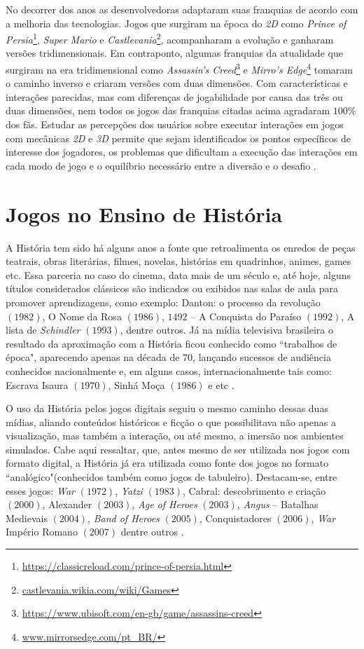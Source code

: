No decorrer dos anos as desenvolvedoras adaptaram suas franquias de acordo com a melhoria das tecnologias. Jogos que surgiram na época do \textit{2D} como \textit{Prince of Persia}\footnote{\url{https://classicreload.com/prince-of-persia.html}}, \textit{Super Mario} e \textit{Castlevania}\footnote{\url{castlevania.wikia.com/wiki/Games}}, acompanharam a evolução e ganharam versões tridimensionais. Em contraponto, algumas franquias da atualidade que surgiram na era tridimensional como \textit{Assassin’s Creed}\footnote{\url{https://www.ubisoft.com/en-gb/game/assassins-creed}} e \textit{Mirro's Edge}\footnote{\url{www.mirrorsedge.com/pt\_BR/}} tomaram o caminho inverso e criaram versões com duas dimensões. Com características e interações parecidas, mas com diferenças de jogabilidade por causa das três ou duas dimensões, nem todos os jogos das franquias citadas acima agradaram $100\%$ dos fãs. Estudar as percepções dos usuários sobre executar interações em jogos com mecânicas \textit{2D} e \textit{3D} permite que sejam identificados os pontos específicos de interesse dos jogadores, os problemas que dificultam a execução das interações em cada modo de jogo e o equilíbrio necessário entre a diversão e o desafio \cite{bib:lopes2016}.

\section{Jogos no Ensino de História}
\label{sec:gameshistoria}

A História tem sido há alguns anos a fonte que retroalimenta os enredos de peças teatrais, obras literárias, filmes, novelas, histórias em quadrinhos, animes, games etc. Essa parceria no caso do cinema, data mais de um século e, até hoje, alguns títulos considerados clássicos são indicados ou exibidos nas salas de aula para promover aprendizagens, como exemplo: Danton: o processo da revolução $(1982)$, O Nome da Rosa $(1986)$, $1492$ -- A Conquista do Paraíso $(1992)$, A lista de \textit{Schindler} $(1993)$, dentre outros. Já na mídia televisiva brasileira o resultado da aproximação com a História ficou conhecido como ``trabalhos de época", aparecendo apenas na década de $70$, lançando sucessos de audiência conhecidos nacionalmente e, em alguns casos, internacionalmente tais como: Escrava Isaura $(1970)$, Sinhá Moça $(1986)$ e etc \cite{bib:neves2012}.

O uso da História pelos jogos digitais seguiu o mesmo caminho dessas duas mídias, aliando conteúdos históricos e ficção o que possibilitava não apenas a visualização, mas também a interação, ou até mesmo, a imersão nos ambientes simulados. Cabe aqui ressaltar, que, antes mesmo de ser utilizada nos jogos com formato digital, a História já era utilizada como fonte dos jogos no formato ``analógico"\space(conhecidos também como jogos de tabuleiro). Destacam-se, entre esses jogos: \textit{War} $(1972)$, \textit{Yatzi} $(1983)$, Cabral: descobrimento e criação $(2000)$, Alexander $(2003)$, \textit{Age of Heroes} $(2003)$, \textit{Angus} -- Batalhas Medievais $(2004)$, \textit{Band of Heroes} $(2005)$, Conquistadores $(2006)$, \textit{War} Império Romano $(2007)$ dentre outros \cite{bib:neves2012}.

